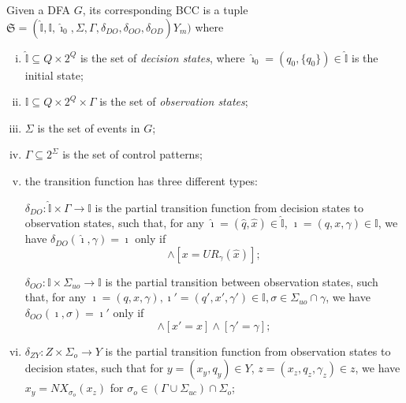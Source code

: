 \documentclass[final,5p,times,twocolumn,authoryear]{elsarticle}
\begin{document}
\begin{definition}\label{def:bcc}
Given a DFA $G$, its corresponding BCC is a tuple
$
\mathfrak{S} = (\hat{\mathbb{I}}, \mathbb{I}, \hat{\imath}_0, \Sigma, \Gamma, \delta_{DO}, \delta_{OO}, \delta_{OD})
Y_m)
$
where
\begin{enumerate}[(i)]
    \item 
    $\hat{\mathbb{I}} \subseteq Q \times 2^Q$ is the set of  \emph{decision states}, 
    where $\hat{\imath}_0 = ( q_0,\{ q_0 \}) \in \hat{\mathbb{I}}$ is the initial state; 
    \item 
    $\mathbb{I}  \subseteq Q \times 2^Q\times \Gamma$ is the set of  \emph{observation states};
    \item 
    $\Sigma$ is the set of events in $G$;
    \item
    $\Gamma \subseteq 2^{\Sigma}$ is the set of control patterns; 
    \item 
    the transition function has three different types: 
    
    $\delta_{DO} : \hat{\mathbb{I}} \times \Gamma \rightarrow \mathbb{I}$ is the partial transition function from decision states to observation states, such that, for any
    $\hat{\imath} = (\hat{q}, \hat{x}) \in \hat{\mathbb{I}}$, 
    $\imath = ({q}, {x},\gamma) \in {\mathbb{I}}$,
    we have $\delta_{DO}(\hat{\imath},\gamma)=\imath$ only if 
    \begin{equation}
        [q=\hat{q}] \wedge [{x} = UR_{\gamma}(\hat{x})];
    \end{equation}
    
    $\delta_{OO} : \mathbb{I} \times \Sigma_{uo} \rightarrow \mathbb{I}$ is the partial transition between observation states, such that, for any
    $\imath = ({q}, {x},\gamma),\imath' = ({q}', {x}',\gamma')  \in {\mathbb{I}},\sigma\in\Sigma_{uo}\cap\gamma$,
    we have $\delta_{OO}({\imath},\sigma)=\imath'$ only if 
    \begin{equation}
        [q'=\delta(q,\sigma)] \wedge [x'=x]  \wedge [\gamma'=\gamma];
    \end{equation}

    \item $\delta_{ZY} : Z \times \Sigma_o \rightarrow Y$ is the partial transition function from observation states to decision states, such that for $y = (x_y, q_y) \in Y$, $z = (x_z, q_z, \gamma_z) \in z$, we have $x_y = NX_{\sigma_o}(x_z)$ for $\sigma_o \in (\Gamma \cup \Sigma_{uc}) \cap \Sigma_o$;

    
\end{enumerate}
\end{definition}
\end{document}
